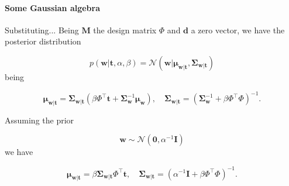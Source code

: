 \begin{frame}{\insertsection}
	\framesubtitle{Some Gaussian algebra}

	\begin{block}{Substituting...}
		Being $\mathbf{M}$ the design matrix $\Phi$ and $\mathbf{d}$ a zero vector, we have the posterior distribution

		\begin{equation*}
			p(\mathbf{w}|\mathbf{t},\alpha,\beta) = \mathcal{N} \left( \mathbf{w} | \boldsymbol{\mu}_{\mathbf{w}|\mathbf{t}} , \boldsymbol{\Sigma}_{\mathbf{w}|\mathbf{t}}\right)
		\end{equation*}
		being

		\begin{equation*}
		\boldsymbol{\mu}_{\mathbf{w}|\mathbf{t}}=\boldsymbol{\Sigma}_{\mathbf{w}|\mathbf{t}}\left(\beta \Phi^\top \mathbf{t}+\boldsymbol{\Sigma}_{\mathbf{w}}^{-1} \boldsymbol{\mu}_{\mathbf{w}}\right), \quad \boldsymbol{\Sigma}_{\mathbf{w}|\mathbf{t}}=\left(\boldsymbol{\Sigma}_{\mathbf{w}}^{-1}+ \beta \Phi^\top \Phi\right)^{-1}.
		\end{equation*}
		
		Assuming the prior

		\begin{equation*}
			\mathbf{w} \sim \mathcal{N} \left( \mathbf{0}, \alpha^{-1} \mathbf{I} \right)
		\end{equation*} we have

		
		\begin{equation*}
			\boldsymbol{\mu}_{\mathbf{w}|\mathbf{t}}=\beta \boldsymbol{\Sigma}_{\mathbf{w}|\mathbf{t}}  \Phi^\top \mathbf{t}, \quad \boldsymbol{\Sigma}_{\mathbf{w}|\mathbf{t}}=\left(\alpha^{-1} \mathbf{I}+ \beta \Phi^\top \Phi\right)^{-1}.
			\end{equation*}

	\end{block}
\end{frame}

